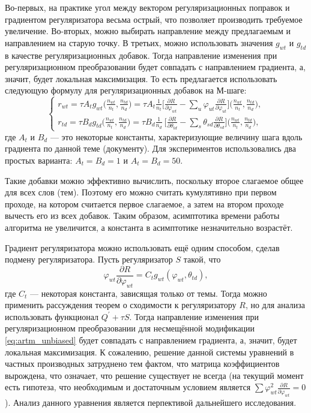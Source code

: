 \documentclass[12pt]{article}
\renewcommand{\phi}{\varphi}
\begin{document}
Во-первых, на практике угол между вектором регуляризационных поправок и градиентом регуляризатора весьма острый, что позволяет производить требуемое увеличение. Во-вторых, можно выбирать направление между предлагаемым  и направлением на старую точку. В третьих, можно использовать значения $g_{wt}$ и $g_{td}$ в качестве регуляризационных добавок. Тогда направление изменения при регуляризационном преобразовании будет совпадать с направлением градиента, а, значит, будет локальная максимизация. То есть предлагается использовать следующую формулу для регуляризационных добавок на М-шаге:
\begin{equation}
\label{eq:artm_gradient}
\left\{
	\begin{aligned}
		r_{wt} = \tau A_t g_{wt}\bigg(\frac{n_{wt}}{n_t}, \frac{n_{td}}{n_d}\bigg) = \tau A_t \frac{1}{n_t} \bigg[{\frac{\partial{R}}{\partial{\phi_{wt}}} - \sum\limits_u \phi_{ut} \frac{\partial{R}}{\partial{\phi_{ut}}} }\bigg] \bigg(\frac{n_{wt}}{n_t}, \frac{n_{td}}{n_d}\bigg),\\
		r_{td} = \tau B_d g_{td} \bigg(\frac{n_{wt}}{n_t}, \frac{n_{td}}{n_d}\bigg) = \tau B_d \frac{1}{n_d} \ \bigg[ {\frac{\partial{R}}{\partial{\theta_{td}}} - \sum\limits_s \theta_{sd} \frac{\partial{R}}{\partial{\theta_{sd}}} }\bigg] \bigg(\frac{n_{wt}}{n_t}, \frac{n_{td}}{n_d}\bigg) ,
	\end{aligned}
\right.
\end{equation}
где $A_t$ и $B_d$ --- это некоторые константы, характеризующие величину шага вдоль градиента по данной теме (документу). Для экспериментов использовались два простых варианта: $A_t = B_d = 1$ и $A_t=B_d=50$.

Такие добавки можно эффективно вычислить, поскольку второе слагаемое общее для всех слов (тем). Поэтому его можно считать кумулятивно при первом проходе, на котором считается первое слагаемое, а затем на втором проходе вычесть его из всех добавок. Таким образом, асимптотика времени работы алгоритма не увеличится, а константа в асимптотике незначительно возрастёт.

Градиент регуляризатора можно использовать ещё одним способом, сделав подмену регуляризатора. Пусть регуляризатор $S$ такой, что 
\begin{equation}
\label{eq:substitution}
\phi_{wt}\frac{\partial{R}}{\partial{\phi_{wt}}} = C_t g_{wt}(\phi_{wt}, \theta_{td}),
\end{equation}
где $C_t$ --- некоторая константа, зависящая только от темы. Тогда можно применить рассуждения теорем о сходимости к  регуляризатору $R$, но для анализа использовать функционал $Q^{\prime} + \tau S$. Тогда направление изменения при регуляризационном преобразовании для несмещённой модификации \eqref{eq:artm_unbiased} будет совпадать с направлением градиента, а, значит, будет локальная максимизация. К сожалению, решение данной системы уравнений в частных производных затруднено тем фактом, что матрица коэффициентов вырождена, что означает, что решение существует не всегда (на текущий момент есть гипотеза, что необходимым и достаточным условием является $\sum \phi_{wt}^2 \frac{\partial{R}}{\partial{\phi_{wt}}} = 0$). Анализ данного уравнения является перпективой дальнейшего исследования.
\end{document}
